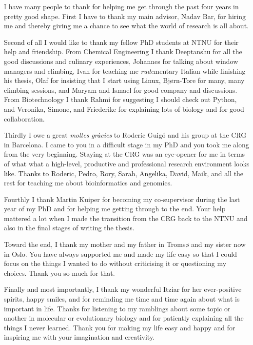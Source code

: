 I have many people to thank for helping me get through the past four years in
pretty good shape. First I have to thank my main advisor, Nadav Bar, for hiring
me and thereby giving me a chance to see what the world of research is all
about.

Second of all I would like to thank my fellow PhD students at NTNU for their
help and friendship. From Chemical Engineering I thank Deeptanshu for all the
good discussions and culinary experiences, Johannes for talking about window
managers and climbing, Ivan for teaching me \textit{rude}mentary Italian while
finishing his thesis, Olaf for insisting that I start using Linux, Bjørn-Tore
for many, many climbing sessions, and Maryam and Ismael for good company and
discussions. From Biotechnology I thank Rahmi for suggesting I should check out
Python, and Veronika, Simone, and Friederike for explaining lots of biology and
for good collaboration.

Thirdly I owe a great \textit{moltes gràcies} to Roderic Guigó and his group at
the CRG in Barcelona. I came to you in a difficult stage in my PhD and you took
me along from the very beginning. Staying at the CRG was an eye-opener for me
in terms of what what a high-level, productive and professional research
environment looks like. Thanks to Roderic, Pedro, Rory, Sarah, Angelika, David,
Maik, and all the rest for teaching me about bioinformatics and genomics.

Fourthly I thank Martin Kuiper for becoming my co-supervisor during the last
year of my PhD and for helping me getting through to the end. Your help
mattered a lot when I made the transition from the CRG back to the NTNU and
also in the final stages of writing the thesis.

Toward the end, I thank my mother and my father in Tromsø and my sister now in
Oslo. You have always supported me and made my life easy so that I could focus
on the things I wanted to do without criticising it or questioning my choices.
Thank you so much for that.

Finally and most importantly, I thank my wonderful Itziar for her ever-positive
spirits, happy smiles, and for reminding me time and time again about what is
important in life. Thanks for listening to my ramblings about some topic or
another in molecular or evolutionary biology and for patiently explaining all
the things I never learned. Thank you for making my life easy and happy and for
inspiring me with your imagination and creativity.
